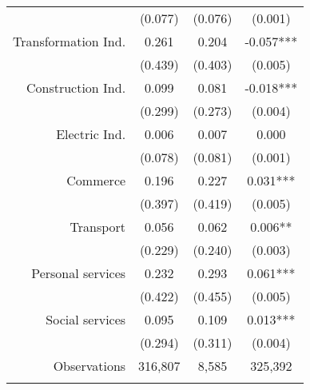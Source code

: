 \begin{tabular}{r|rrr}
\multicolumn{1}{p{12.085em}|}{} & \multicolumn{1}{c}{(0.077)} & \multicolumn{1}{c}{(0.076)} & \multicolumn{1}{c}{(0.001)} \\
\multicolumn{1}{p{12.085em}|}{Transformation Ind.} & \multicolumn{1}{c}{0.261} & \multicolumn{1}{c}{0.204} & \multicolumn{1}{c}{-0.057***} \\
\multicolumn{1}{p{12.085em}|}{} & \multicolumn{1}{c}{(0.439)} & \multicolumn{1}{c}{(0.403)} & \multicolumn{1}{c}{(0.005)} \\
\multicolumn{1}{p{12.085em}|}{Construction Ind.} & \multicolumn{1}{c}{0.099} & \multicolumn{1}{c}{0.081} & \multicolumn{1}{c}{-0.018***} \\
\multicolumn{1}{p{12.085em}|}{} & \multicolumn{1}{c}{(0.299)} & \multicolumn{1}{c}{(0.273)} & \multicolumn{1}{c}{(0.004)} \\
\multicolumn{1}{p{12.085em}|}{Electric Ind.} & \multicolumn{1}{c}{0.006} & \multicolumn{1}{c}{0.007} & \multicolumn{1}{c}{0.000} \\
\multicolumn{1}{p{12.085em}|}{} & \multicolumn{1}{c}{(0.078)} & \multicolumn{1}{c}{(0.081)} & \multicolumn{1}{c}{(0.001)} \\
\multicolumn{1}{p{12.085em}|}{Commerce} & \multicolumn{1}{c}{0.196} & \multicolumn{1}{c}{0.227} & \multicolumn{1}{c}{0.031***} \\
                & \multicolumn{1}{c}{(0.397)} & \multicolumn{1}{c}{(0.419)} & \multicolumn{1}{c}{(0.005)} \\
\multicolumn{1}{p{12.085em}|}{Transport} & \multicolumn{1}{c}{0.056} & \multicolumn{1}{c}{0.062} & \multicolumn{1}{c}{0.006**} \\
\multicolumn{1}{p{12.085em}|}{} & \multicolumn{1}{c}{(0.229)} & \multicolumn{1}{c}{(0.240)} & \multicolumn{1}{c}{(0.003)} \\
\multicolumn{1}{p{12.085em}|}{Personal services} & \multicolumn{1}{c}{0.232} & \multicolumn{1}{c}{0.293} & \multicolumn{1}{c}{0.061***} \\
\multicolumn{1}{p{12.085em}|}{} & \multicolumn{1}{c}{(0.422)} & \multicolumn{1}{c}{(0.455)} & \multicolumn{1}{c}{(0.005)} \\
\multicolumn{1}{p{12.085em}|}{Social services} & \multicolumn{1}{c}{0.095} & \multicolumn{1}{c}{0.109} & \multicolumn{1}{c}{0.013***} \\
\multicolumn{1}{p{12.085em}|}{} & \multicolumn{1}{c}{(0.294)} & \multicolumn{1}{c}{(0.311)} & \multicolumn{1}{c}{(0.004)} \\
\midrule
\multicolumn{1}{p{12.085em}|}{Observations} & \multicolumn{1}{c}{316,807} & \multicolumn{1}{c}{8,585} & \multicolumn{1}{c}{325,392} \\
                &                 &                 &  \\
\bottomrule
\bottomrule
\end{tabular}%

